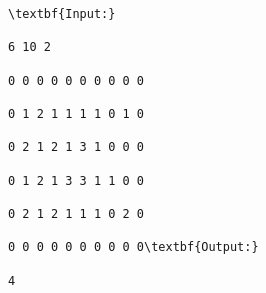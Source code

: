 \begin{verbatim}
\textbf{Input:}

6 10 2

0 0 0 0 0 0 0 0 0 0

0 1 2 1 1 1 1 0 1 0

0 2 1 2 1 3 1 0 0 0

0 1 2 1 3 3 1 1 0 0

0 2 1 2 1 1 1 0 2 0

0 0 0 0 0 0 0 0 0 0\textbf{Output:}

4\end{verbatim}
